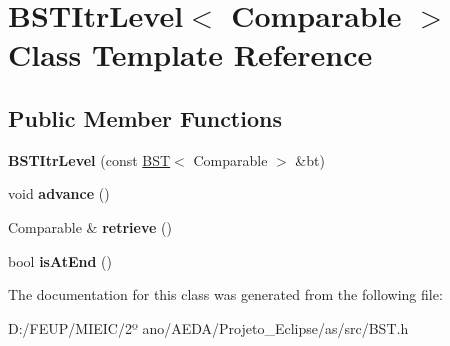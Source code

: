 \hypertarget{class_b_s_t_itr_level}{}\section{B\+S\+T\+Itr\+Level$<$ Comparable $>$ Class Template Reference}
\label{class_b_s_t_itr_level}
\subsection*{Public Member Functions}
\begin{DoxyCompactItemize}
\item 
\mbox{\label{class_b_s_t_itr_level_a8fd5cdde93eb182c4cd5cf6b2c5efaeb}} 
{\bfseries B\+S\+T\+Itr\+Level} (const \hyperlink{class_b_s_t}{B\+ST}$<$ Comparable $>$ \&bt)
\item 
\mbox{\label{class_b_s_t_itr_level_ad54a6fa289a59d6050b507abe40d463b}} 
void {\bfseries advance} ()
\item 
\mbox{\label{class_b_s_t_itr_level_a0340bd9f21f72ae25348f383e67e7f91}} 
Comparable \& {\bfseries retrieve} ()
\item 
\mbox{\label{class_b_s_t_itr_level_a89bc8e81dde255fd6bad917cacc0d489}} 
bool {\bfseries is\+At\+End} ()
\end{DoxyCompactItemize}


The documentation for this class was generated from the following file\+:\begin{DoxyCompactItemize}
\item 
D\+:/\+F\+E\+U\+P/\+M\+I\+E\+I\+C/2º ano/\+A\+E\+D\+A/\+Projeto\+\_\+\+Eclipse/as/src/B\+S\+T.\+h\end{DoxyCompactItemize}
